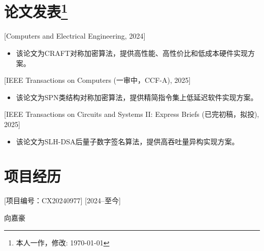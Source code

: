 \documentclass{resume}
\begin{document}


\section{论文发表\protect\footnote{本人一作，修改: \today}}

[Computers and Electrical Engineering, 2024]
\begin{itemize}
  \item 该论文为CRAFT对称加密算法，提供高性能、高性价比和低成本硬件实现方案。
\end{itemize}

[IEEE Transactions on Computers (一审中，CCF-A), 2025]
\begin{itemize}
  \item 该论文为SPN类结构对称加密算法，提供精简指令集上低延迟软件实现方案。
\end{itemize}

[IEEE Transactions on Circuits and Systems II: Express Briefs (已完初稿，拟投), 2025]
\begin{itemize}
  \item 该论文为SLH-DSA后量子数字签名算法，提供高吞吐量异构实现方案。
\end{itemize}

\section{项目经历}
[项目编号：CX20240977]
[2024--至今]

\vspace{2em}
\begin{flushleft}
  \Large
  向嘉豪
\end{flushleft}
\end{document}
